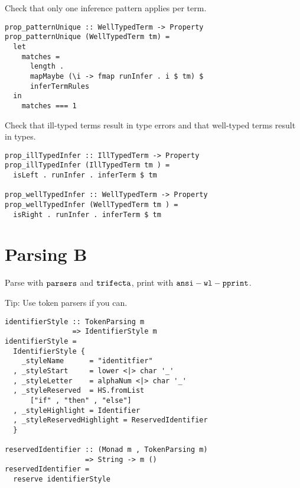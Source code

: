 \documentclass{beamer}
\begin{document}
\begin{frame}[fragile]
  \begin{center}
   Check that only one inference pattern applies per term.
  \end{center}
  \begin{verbatim}
prop_patternUnique :: WellTypedTerm -> Property
prop_patternUnique (WellTypedTerm tm) =
  let
    matches =
      length .
      mapMaybe (\i -> fmap runInfer . i $ tm) $
      inferTermRules
  in
    matches === 1
  \end{verbatim}
\end{frame} 

\begin{frame}[fragile]
  \begin{center}
   Check that ill-typed terms result in type errors and that well-typed terms
   result in types.
  \end{center}
  \begin{verbatim}
prop_illTypedInfer :: IllTypedTerm -> Property
prop_illTypedInfer (IllTypedTerm tm ) =
  isLeft . runInfer . inferTerm $ tm

prop_wellTypedInfer :: WellTypedTerm -> Property
prop_wellTypedInfer (WellTypedTerm tm ) =
  isRight . runInfer . inferTerm $ tm
  \end{verbatim}
\end{frame} 

\section{Parsing B}

\begin{frame}[c]
  \begin{center}
Parse with $\tt{parsers}$ and $\tt{trifecta}$, print with $\tt{ansi-wl-pprint}$.
  \end{center}
\end{frame}

\begin{frame}[c]
  \begin{center}
Tip: Use token parsers if you can.
  \end{center}
\end{frame}

\begin{frame}[fragile]
  \begin{verbatim}
identifierStyle :: TokenParsing m
                => IdentifierStyle m
identifierStyle =
  IdentifierStyle {
    _styleName      = "identitfier"
  , _styleStart     = lower <|> char '_'
  , _styleLetter    = alphaNum <|> char '_'
  , _styleReserved  = HS.fromList 
      ["if" , "then" , "else"]
  , _styleHighlight = Identifier
  , _styleReservedHighlight = ReservedIdentifier
  }

reservedIdentifier :: (Monad m , TokenParsing m)
                   => String -> m ()
reservedIdentifier =
  reserve identifierStyle
  \end{verbatim}
\end{frame} 
\end{document}

